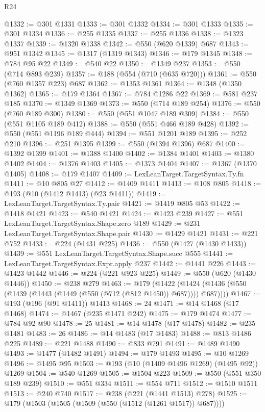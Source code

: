 \begin{lexlean}{R24}
\begin{coremodule}
@1332 := @301 @1331
@1333 := @301 @1332
@1334 := @301 @1333
@1335 := @301 @1334
@1336 := @255 @1335
@1337 := @255 @1336
@1338 := @1323 @1337
@1339 := @1320 @1338
@1342 := @550 (@620 @1339) @687
@1343 := @951 @1342
@1345 := @1317 (@1319 @1343)
@1346 := @179 @1345
@1348 := @784 @95 @22
@1349 := @540 @22
@1350 := @1349 @237
@1353 := @550 (@714 @893 @239)
@1357 := @188 (@554 (@710 (@635 @720)))
@1361 := @550 (@760 @1357 @223) @687
@1362 := @1353 @1361
@1364 := @1348 (@1350 @1362)
@1365 := @179 @1364
@1367 := @784 @1286 @22
@1369 := @581 @237 @185
@1370 := @1349 @1369
@1373 := @550 (@714 @189 @254)
@1376 := @550 (@760 @189 @300)
@1380 := @550 (@551 @1047 @189 @309)
@1384 := @550 (@551 @1105 @189 @412)
@1388 := @550 (@551 @466 @189 @428)
@1392 := @550 (@551 @1196 @189 @444)
@1394 := @551 @1201 @189
@1395 := @252 @210
@1396 := @251 @1395
@1399 := @550 (@1394 @1396) @687
@1400 := @1392 @1399
@1401 := @1388 @1400
@1402 := @1384 @1401
@1403 := @1380 @1402
@1404 := @1376 @1403
@1405 := @1373 @1404
@1407 := @1367 (@1370 @1405)
@1408 := @179 @1407
@1409 := LexLeanTarget.TargetSyntax.Ty.fn
@1411 := @10 @805 @27
@1412 := @1409 @1411
@1413 := @108 @805
@1418 := @193 (@10 (@1412 @1413) (@23 @1411))
@1419 := LexLeanTarget.TargetSyntax.Ty.pair
@1421 := @1419 @805 @53
@1422 := @1418 @1421
@1423 := @540 @1421
@1424 := @1423 @239
@1427 := @551 LexLeanTarget.TargetSyntax.Shape.zero @189
@1429 := @231 LexLeanTarget.TargetSyntax.Shape.pair
@1430 := @1429 @1421
@1431 := @221 @752
@1433 := @224 (@1431 @225)
@1436 := @550 (@1427 (@1430 @1433))
@1439 := @551 LexLeanTarget.TargetSyntax.Shape.succ @555
@1441 := LexLeanTarget.TargetSyntax.Expr.apply @237
@1442 := @1441 @226
@1443 := @1423 @1442
@1446 := @224 (@221 @923 @225)
@1449 := @550 (@620 (@1430 @1446))
@1450 := @238 @279
@1463 := @179
    (@1422 (@1424 (@1436 (@550 (@1439 (@1443 (@1449 (@550 (@712 (@812 @1450)) @687)))) @687))))
@1467 := @193 (@196 (@91 @1411)) @1413
@1468 := 24
@1471 := @14 @1468 (@17 @1468)
@1474 := @1467 (@235 @1471 @242)
@1475 := @179 @1474
@1477 := @784 @92 @90
@1478 := 25
@1481 := @14 @1478 (@17 @1478)
@1482 := @235 @1481
@1483 := 26
@1486 := @14 @1483 (@17 @1483)
@1488 := @813 @1486 @225
@1489 := @221 @1488
@1490 := @833 @791
@1491 := @1489 @1490
@1493 := @1477 (@1482 @1491)
@1494 := @179 @1493
@1495 := @10 @1269
@1496 := @1495 @95
@1503 := @193 (@10 (@1409 @1496 @1269) (@1495 @92)) @1269
@1504 := @540 @1269
@1505 := @1504 @223
@1509 := @550 (@551 @350 @189 @239)
@1510 := @551 @334
@1511 := @554 @711
@1512 := @1510 @1511
@1513 := @240 @740
@1517 := @238 (@221 (@1441 @1513) @278)
@1525 := @179 (@1503 (@1505 (@1509 (@550 (@1512 (@1261 @1517)) @687))))

\end{coremodule}
\end{lexlean}
